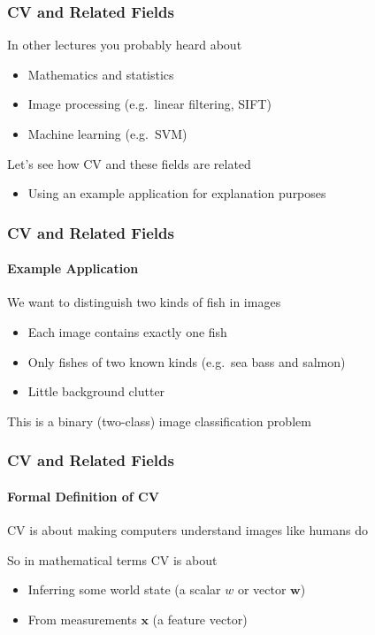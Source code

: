\documentclass[xetex,professionalfont]{beamer}
\renewcommand{\vec}[1]{\ensuremath{\mathbf{#1}}}
\newcommand{\vw}{\vec{w}}
\newcommand{\vx}{\vec{x}}
\renewcommand\emph[1]{\textcolor{tuwcvl_inf_red}{#1}}
\begin{document}

\begin{frame}
\frametitle{CV and Related Fields}

In other lectures you probably heard about
\begin{itemize}
    \item Mathematics and statistics
    \item Image processing (e.g.\ linear filtering, SIFT)
    \item Machine learning (e.g.\ SVM)
\end{itemize}

\bigskip
Let's see how CV and these fields are related
\begin{itemize}
    \item Using an example application for explanation purposes
\end{itemize}

\end{frame}


\begin{frame}
\frametitle{CV and Related Fields}
\framesubtitle{Example Application}

We want to distinguish two kinds of fish in images
\begin{itemize}
    \item Each image contains exactly one fish
    \item Only fishes of two known kinds (e.g.\ sea bass and salmon) %
    \item Little background clutter
\end{itemize}

\bigskip
This is a binary (two-class) \emph{image classification} problem

\end{frame}


\begin{frame}
\frametitle{CV and Related Fields}
\framesubtitle{Formal Definition of CV}

CV is about making computers understand images like humans do

\bigskip
So in mathematical terms CV is about
\begin{itemize}
    \item Inferring some world state (a scalar $w$ or vector $\vw$)
    \item From measurements $\vx$ (a \emph{feature vector})
\end{itemize}

\end{frame}
\end{document}
